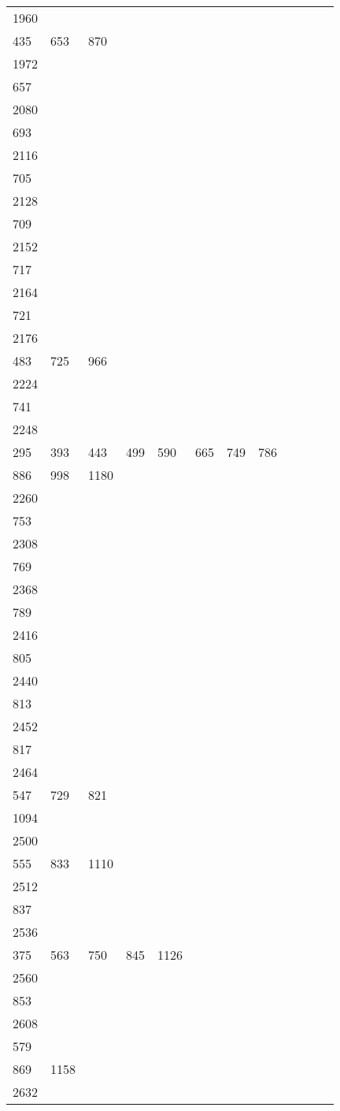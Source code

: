 \begin{longtable}{llllllllllll}
1960&&&&&&&&&&&\\
435& 653& 870& \\
1972&&&&&&&&&&&\\
657& \\
2080&&&&&&&&&&&\\
693& \\
2116&&&&&&&&&&&\\
705& \\
2128&&&&&&&&&&&\\
709& \\
2152&&&&&&&&&&&\\
717& \\
2164&&&&&&&&&&&\\
721\\
2176&&&&&&&&&&&\\
483& 725& 966& \\
2224&&&&&&&&&&&\\
741& \\
2248&&&&&&&&&&&\\
295& 393& 443& 499& 590& 665& 749& 786\\
886& 998& 1180& \\
2260&&&&&&&&&&&\\
753& \\
2308&&&&&&&&&&&\\
769& \\
2368&&&&&&&&&&&\\
789& \\
2416&&&&&&&&&&&\\
805& \\
2440&&&&&&&&&&&\\
813& \\
2452&&&&&&&&&&&\\
817& \\
2464&&&&&&&&&&&\\
547& 729& 821\\
1094& \\
2500&&&&&&&&&&&\\
555& 833& 1110& \\
2512&&&&&&&&&&&\\
837& \\
2536&&&&&&&&&&&\\
375& 563& 750& 845& 1126& \\
2560&&&&&&&&&&&\\
853& \\
2608&&&&&&&&&&&\\
579\\
869& 1158& \\
2632&&&&&&&&&&&\\

\end{longtable}
